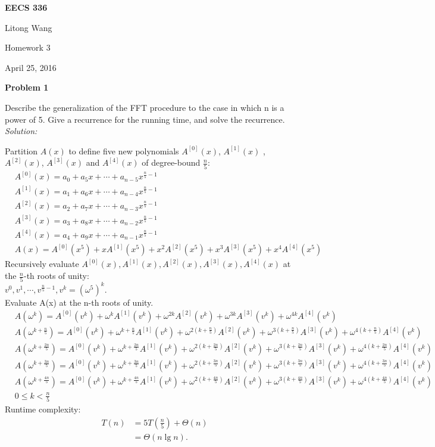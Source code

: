 \documentclass[12pt,letterpaper]{article}
\def\pp{\par\noindent}
\newcommand{\problem}[1]{ \bigskip \pp \textbf{Problem #1}\par}
\newcommand{\solution}{\textit{Solution:}\par}
\begin{document}
\centerline{\bf EECS 336}

\medskip
\centerline{Litong Wang}
\centerline{Homework 3}
\centerline{April 25, 2016}
\bigskip


\problem{1}
Describe the generalization of the FFT procedure to the case in which n is a power of 5. Give a recurrence for the running time, and solve the recurrence. \\
\solution
Partition $A(x)$ to define five new polynomials $A^{[0]}(x)$, $A^{[1]}(x)$ , $A^{[2]}(x)$, $A^{[3]}(x)$ and $A^{[4]}(x)$ of degree-bound $\frac{n}{5}$:
\begin{align*}
& A^{[0]}(x) = a_0 + a_5 x + \cdots + a_{n-5} x^{\frac{n}{5}-1} \\
& A^{[1]}(x) = a_1 + a_6 x + \cdots + a_{n-4} x^{\frac{n}{5}-1} \\
& A^{[2]}(x) = a_2 + a_7 x + \cdots + a_{n-3} x^{\frac{n}{5}-1} \\
& A^{[3]}(x) = a_3 + a_8 x + \cdots + a_{n-2} x^{\frac{n}{5}-1} \\
& A^{[4]}(x) = a_4 + a_9 x + \cdots + a_{n-1} x^{\frac{n}{5}-1} \\
& A(x) = A^{[0]}(x^5) + x A^{[1]}(x^5) + x^2 A^{[2]}(x^5) + x^3 A^{[3]}(x^5) + x^4 A^{[4]}(x^5)
\end{align*}
Recursively evaluate $ A^{[0]}(x),A^{[1]}(x),A^{[2]}(x),A^{[3]}(x),A^{[4]}(x)$ at the $\frac{n}{5}$-th roots of unity: \\
$v^0,v^1,\cdots,v^{\frac{n}{5}-1}, v^k = (\omega^5)^k$. \\
Evaluate A(x) at the n-th roots of unity.
\begin{align*}
& A(\omega^k) = A^{[0]}(v^k) + \omega^{k} A^{[1]}(v^k) + \omega^{2k} A^{[2]}(v^k) +\omega^{3k} A^{[3]}(v^k) + \omega^{4k} A^{[4]}(v^k) \\
& A(\omega^{k+\frac{n}{5}}) =  A^{[0]}(v^k) + \omega^{k+\frac{n}{5}} A^{[1]}(v^k) + \omega^{2(k+\frac{n}{5})} A^{[2]}(v^k) +\omega^{3(k+\frac{n}{5})} A^{[3]}(v^k) + \omega^{4(k+\frac{n}{5})} A^{[4]}(v^k) \\
& A(\omega^{k+\frac{2n}{5}}) = A^{[0]}(v^k) + \omega^{k+\frac{2n}{5}} A^{[1]}(v^k) + \omega^{2(k+\frac{2n}{5})} A^{[2]}(v^k) +\omega^{3(k+\frac{2n}{5})} A^{[3]}(v^k) + \omega^{4(k+\frac{2n}{5})} A^{[4]}(v^k) \\
& A(\omega^{k+\frac{3n}{5}}) = A^{[0]}(v^k) + \omega^{k+\frac{3n}{5}} A^{[1]}(v^k) + \omega^{2(k+\frac{3n}{5})} A^{[2]}(v^k) +\omega^{3(k+\frac{3n}{5})} A^{[3]}(v^k) + \omega^{4(k+\frac{3n}{5})} A^{[4]}(v^k) \\
& A(\omega^{k+\frac{4n}{5}}) = A^{[0]}(v^k) + \omega^{k+\frac{4n}{5}} A^{[1]}(v^k) + \omega^{2(k+\frac{4n}{5})} A^{[2]}(v^k) +\omega^{3(k+\frac{4n}{5})} A^{[3]}(v^k) + \omega^{4(k+\frac{4n}{5})} A^{[4]}(v^k) \\
& 0 \le k < \frac{n}{5} 
\end{align*}
Runtime complexity:
\begin{align*}
T(n) &= 5T(\frac{n}{5}) + \Theta(n) \\
&= \Theta(n \lg n).
\end{align*}
\end{document}
